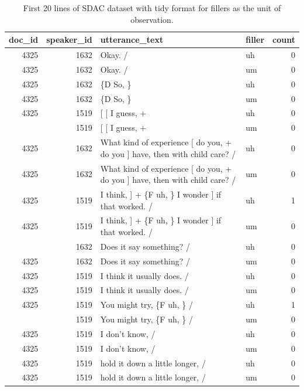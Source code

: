 \documentclass[
  letterpaper,
]{scrbook}
\begin{document}
\hypertarget{tbl-td-sdac-count-disfluencies-longer-show}{}
\begin{table}
\caption{\label{tbl-td-sdac-count-disfluencies-longer-show}First 20 lines of SDAC dataset with tidy format for fillers as the unit
of observation. }\tabularnewline

\centering
\begin{tabular}{rrllr}
\toprule
doc\_id & speaker\_id & utterance\_text & filler & count\\
\midrule
4325 & 1632 & Okay.  / & uh & 0\\
4325 & 1632 & Okay.  / & um & 0\\
4325 & 1632 & \{D So, \} & uh & 0\\
4325 & 1632 & \{D So, \} & um & 0\\
4325 & 1519 & {}[ [ I guess, + & uh & 0\\
\addlinespace
4325 & 1519 & {}[ [ I guess, + & um & 0\\
4325 & 1632 & What kind of experience [ do you, + do you ] have, then with child care? / & uh & 0\\
4325 & 1632 & What kind of experience [ do you, + do you ] have, then with child care? / & um & 0\\
4325 & 1519 & I think, ] + \{F uh, \} I wonder ] if that worked. / & uh & 1\\
4325 & 1519 & I think, ] + \{F uh, \} I wonder ] if that worked. / & um & 0\\
\addlinespace
4325 & 1632 & Does it say something? / & uh & 0\\
4325 & 1632 & Does it say something? / & um & 0\\
4325 & 1519 & I think it usually does.  / & uh & 0\\
4325 & 1519 & I think it usually does.  / & um & 0\\
4325 & 1519 & You might try, \{F uh, \}  / & uh & 1\\
\addlinespace
4325 & 1519 & You might try, \{F uh, \}  / & um & 0\\
4325 & 1519 & I don't know,  / & uh & 0\\
4325 & 1519 & I don't know,  / & um & 0\\
4325 & 1519 & hold it down a little longer,  / & uh & 0\\
4325 & 1519 & hold it down a little longer,  / & um & 0\\
\bottomrule
\end{tabular}
\end{table}
\end{document}
